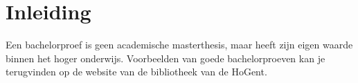 \chapter{Inleiding}
\label{sec:inleiding}


%
%
%
%
%
%

Een bachelorproef is geen academische masterthesis, maar heeft zijn eigen waarde binnen het hoger onderwijs. Voorbeelden van goede bachelorproeven kan je terugvinden op de website van de bibliotheek van de HoGent.
